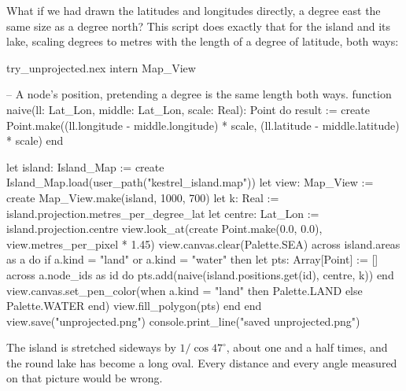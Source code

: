 What if we had drawn the latitudes and longitudes directly, a degree east
the same size as a degree north? This script does exactly that for the
island and its lake, scaling degrees to metres with the length of a degree
of latitude, both ways:

\begin{tryit}{try_unprojected.nex}
intern Map_View

-- A node's position, pretending a degree is the same length both ways.
function naive(ll: Lat_Lon, middle: Lat_Lon, scale: Real): Point do
  result := create Point.make((ll.longitude - middle.longitude) * scale,
    (ll.latitude - middle.latitude) * scale)
end

let island: Island_Map := create Island_Map.load(user_path("kestrel_island.map"))
let view: Map_View := create Map_View.make(island, 1000, 700)
let k: Real := island.projection.metres_per_degree_lat
let centre: Lat_Lon := island.projection.centre
view.look_at(create Point.make(0.0, 0.0), view.metres_per_pixel * 1.45)
view.canvas.clear(Palette.SEA)
across island.areas as a do
  if a.kind = "land" or a.kind = "water" then
    let pts: Array[Point] := []
    across a.node_ids as id do
      pts.add(naive(island.positions.get(id), centre, k))
    end
    view.canvas.set_pen_color(when a.kind = "land" then Palette.LAND else Palette.WATER end)
    view.fill_polygon(pts)
  end
end
view.save("unprojected.png")
console.print_line("saved unprojected.png")
\end{tryit}

The island is stretched sideways by $1/\cos 47^\circ$, about one and a
half times, and the round lake has become a long oval. Every distance and
every angle measured on that picture would be wrong.
